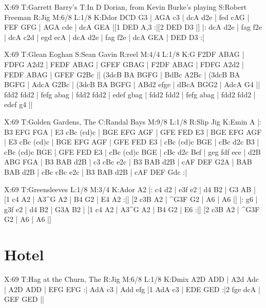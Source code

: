 \documentclass{article}
\begin{document}
\begin{abc}[name]
X:69
T:Garrett Barry's
T:In D Dorian, from Kevin Burke's playing
S:Robert Freeman
R:Jig
M:6/8
L:1/8
K:Ddor
DCD G3 | AGA c3 | dcA d2e | fed cAG |
FEF GFG | AGA cde | dcA GEA |[1 DED A,3 :|[2 DED D3 |]
|: dcA d2e | fag f2e | dcA c2d | egd ecA |
dcA d2e | fag f2e | dcA GEA | DED D3 :|
\end{abc}

\begin{abc}[name]
X:69
T:Glean Eoghan
S:Sean Gavin
R:reel
M:4/4
L:1/8
K:G
F2DF ABAG | FDFG A2d2 | FEDF ABAG | GFEF GBAG |
F2DF ABAG | FDFG A2d2 | FEDF ABAG | GFEF G2Bc ||
(3dcB BA BGFG | BdBc A2Bc | (3dcB BA BGFG | AdcA G2Bc |
(3dcB BA BGFG | ABd2 efge | dBcA BGG2 | AdcA G4 ||
fdd2 fdd2 | fefg abag | fdd2 fdd2 | edef gbag |
fdd2 fdd2 | fefg abag | fdd2 fdd2 | edef g4 ||
\end{abc}

\begin{abc}[name]
X:69
T:Golden Gardens, The
C:Randal Bays
M:9/8
L:1/8
R:Slip Jig
K:Emin
A |: B3 EFG FGA | E3 cBc (cd)c | BGE EFG AGF | GFE FED E3 |
BGE EFG AGF | E3 cBc (cd)c | BGE EFG AGF | GFE FED E3 |
cBc (cd)c BGE | cBc d2c B3 | cBc (cd)c BGE | GFE FED E3 |
cBc (cd)c BGE | cBc d2c Bef | geg fdf ece | d2B ABG FGA |
B3 BAB d2B | c3 cBc e2c | B3 BAB d2B | cAF DEF G2A |
BAB BAB d2B | cBc cBc e2c | B3 BAB d2B | cAF DEF Gdc :|
\end{abc}

\begin{abc}[name]
X:69
T:Greensleeves
L:1/8
M:3/4
K:Ador
A2 |: c4 d2 | e3f e2 | d4 B2 | G3 AB |
[1 c4 A2 | A3^G A2 | B4 G2 | E4 A2 :|]
[2 c3B A2 | ^G3F G2 | A6 | A6 |]
|: g6 | g3f e2 | d4 B2 | G3A B2 |
[1 c4 A2 | A3^G A2 | B4 G2 | E6 :|]
[2 c3B A2 | ^G3F G2 | A6 | A6 |]
\end{abc}

\section{Hotel}

\begin{abc}[name]
X:69
T:Hag at the Churn, The
R:Jig
M:6/8
L:1/8
K:Dmix
A2D ADD | A2d Adc | A2D ADD | EFG EFG :|
AdA c3 | Add efg |1 AdA c3 | EDE GED :|2 fge dcA | GEF GED ||
\end{abc}
\end{document}
